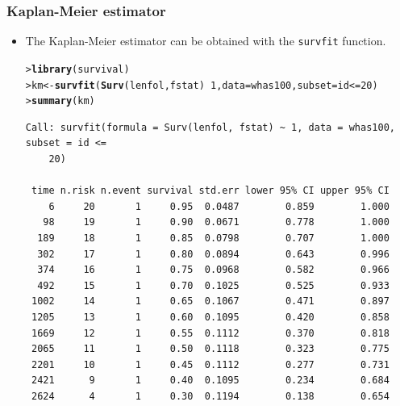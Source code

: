 \documentclass[10pt]{beamer}\usepackage[]{graphicx}\usepackage[]{color}
\makeatletter
\newcommand{\hlnum}[1]{\textcolor[rgb]{0.686,0.059,0.569}{#1}}%
\newcommand{\hlopt}[1]{\textcolor[rgb]{0,0,0}{#1}}%
\newcommand{\hlstd}[1]{\textcolor[rgb]{0.345,0.345,0.345}{#1}}%
\newcommand{\hlkwb}[1]{\textcolor[rgb]{0.69,0.353,0.396}{#1}}%
\newcommand{\hlkwc}[1]{\textcolor[rgb]{0.333,0.667,0.333}{#1}}%
\newcommand{\hlkwd}[1]{\textcolor[rgb]{0.737,0.353,0.396}{\textbf{#1}}}%
\newenvironment{kframe}{%
 \def\at@end@of@kframe{}%
 \ifinner\ifhmode%
  \def\at@end@of@kframe{\end{minipage}}%
  \begin{minipage}{\columnwidth}%
 \fi\fi%
 \def\FrameCommand##1{\hskip\@totalleftmargin \hskip-\fboxsep
 \colorbox{shadecolor}{##1}\hskip-\fboxsep
     \hskip-\linewidth \hskip-\@totalleftmargin \hskip\columnwidth}%
 \MakeFramed {\advance\hsize-\width
   \@totalleftmargin\z@ \linewidth\hsize
   \@setminipage}}%
 {\par\unskip\endMakeFramed%
 \at@end@of@kframe}
\newenvironment{knitrout}{}{} %
\renewenvironment{knitrout}{\setlength{\topsep}{-.2mm}}{}
\newcommand{\pkg}[1]{{\textbf{\texttt{#1}}}}
\newcommand{\code}[1]{{\texttt{#1}}}
\makeatother
\begin{document}
\begin{frame}[fragile]
  \frametitle{Kaplan-Meier estimator}
  \begin{itemize}
  \item The Kaplan-Meier estimator can be obtained with the \code{survfit} function.
\begin{knitrout}\scriptsize
{}\color{fgcolor}\begin{kframe}
\begin{alltt}
\hlstd{> }\hlkwd{library}\hlstd{(survival)}
\hlstd{> }\hlstd{km} \hlkwb{<-} \hlkwd{survfit}\hlstd{(}\hlkwd{Surv}\hlstd{(lenfol, fstat)} \hlopt{~} \hlnum{1}\hlstd{,} \hlkwc{data} \hlstd{= whas100,} \hlkwc{subset} \hlstd{= id} \hlopt{<=} \hlnum{20}\hlstd{)}
\hlstd{> }\hlkwd{summary}\hlstd{(km)}
\end{alltt}
\begin{verbatim}
Call: survfit(formula = Surv(lenfol, fstat) ~ 1, data = whas100, subset = id <= 
    20)

 time n.risk n.event survival std.err lower 95% CI upper 95% CI
    6     20       1     0.95  0.0487        0.859        1.000
   98     19       1     0.90  0.0671        0.778        1.000
  189     18       1     0.85  0.0798        0.707        1.000
  302     17       1     0.80  0.0894        0.643        0.996
  374     16       1     0.75  0.0968        0.582        0.966
  492     15       1     0.70  0.1025        0.525        0.933
 1002     14       1     0.65  0.1067        0.471        0.897
 1205     13       1     0.60  0.1095        0.420        0.858
 1669     12       1     0.55  0.1112        0.370        0.818
 2065     11       1     0.50  0.1118        0.323        0.775
 2201     10       1     0.45  0.1112        0.277        0.731
 2421      9       1     0.40  0.1095        0.234        0.684
 2624      4       1     0.30  0.1194        0.138        0.654
\end{verbatim}
\end{kframe}
\end{knitrout}
  \end{itemize}    
\end{frame}
\end{document}
